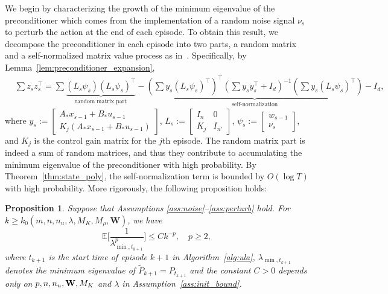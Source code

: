 \documentclass[11pt]{article}
\theoremstyle{plain}
\newtheorem{prop}[thm]{Proposition}
\theoremstyle{definition}
\theoremstyle{remark}
\begin{document}
We begin by characterizing the growth of the minimum eigenvalue of the preconditioner which comes from the implementation of a random noise signal $\nu_s$ to perturb the action at the end of each episode.
To obtain this result, we decompose the preconditioner in each episode into two parts, a random matrix and a self-normalized matrix value process as in~\cite{jedra2022minimal}. 
Specifically, by Lemma~\ref{lem:preconditioner_expansion}, 
\begin{equation}\nonumber
\begin{split}
&\sum z_s z_s^\top=\sum  \underbrace{(L_s\psi_s)(L_s\psi_s)^{\top}}_{\text{random matrix part}} - \underbrace{(\sum  y_s (L_s \psi_s)^{\top})^{\top}(\sum y_sy_s^{\top}+  I_d)^{-1}(\sum   y_s (L_s \psi_s)^{\top})}_{\text{self-normalization}} -  I_d,
\end{split}
\end{equation}
where $y_s := 
\begin{bmatrix}
    A_*x_{s-1} + B_*u_{s-1}          \\
    K_j(A_*x_{s-1} + B_*u_{s-1})
\end{bmatrix}$, 
$L_s := 
\begin{bmatrix}
    I_n & 0\\
    K_j & I_{n'}
\end{bmatrix}$,
 $\psi_s :=
\begin{bmatrix}
    w_{s-1}\\
    \nu_{s}
\end{bmatrix}$, and $K_j$ is  the control gain matrix for the $j$th episode.
The random matrix part is indeed a sum of random matrices, and thus they contribute to accumulating the minimum eigenvalue of the preconditioner with high probability.
By Theorem~\ref{thm:state_poly}, the self-normalization term is bounded by $O(\log T)$ with high probability.
More rigorously, the following proposition holds:

\begin{prop}\label{prop:pers-ex}
Suppose that Assumptions \ref{ass:noise}--\ref{ass:perturb} hold. For  $k\geq k_0(m,n,n_u,\lambda,M_K,M_\rho,\mathbf{W})$, we have
\[
\mathbb{E}\bigg[\frac{1}{\lambda_{\min,t_{k+1}}^p}\bigg] \leq C k^{-p}, \quad p\geq 2,\] where $t_{k+1}$ is the start time of episode $k+1$ in Algorithm~\ref{alg:ula}, 
$\lambda_{\min, t_{k+1}}$ denotes the minimum eigenvalue of $\tilde{P}_{k+1} = P_{t_{k+1}}$ and the constant $C > 0$ depends only on $p, n, n_u, \bold{W}, M_K$ and $\lambda$  in Assumption~\ref{ass:init_bound}.
\end{prop}
\end{document}

